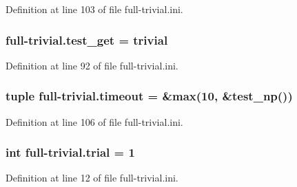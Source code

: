 Definition at line 103 of file full-\/trivial.\-ini.

\hypertarget{namespacefull-trivial_a3973918af8b0679a239a862cdc097804}{
\subsubsection[{test\-\_\-get}]{\setlength{\rightskip}{0pt plus 5cm}full-\/trivial.\-test\-\_\-get = trivial}}\label{namespacefull-trivial_a3973918af8b0679a239a862cdc097804}


Definition at line 92 of file full-\/trivial.\-ini.

\hypertarget{namespacefull-trivial_a87b2271fca0c5c5553c1a20d8ee1c11d}{
\subsubsection[{timeout}]{\setlength{\rightskip}{0pt plus 5cm}tuple full-\/trivial.\-timeout = \&max(10, \&test\-\_\-np())}}\label{namespacefull-trivial_a87b2271fca0c5c5553c1a20d8ee1c11d}


Definition at line 106 of file full-\/trivial.\-ini.

\hypertarget{namespacefull-trivial_a431381ca4d3ce0533b84fdf824145c45}{
\subsubsection[{trial}]{\setlength{\rightskip}{0pt plus 5cm}int full-\/trivial.\-trial = 1}}\label{namespacefull-trivial_a431381ca4d3ce0533b84fdf824145c45}


Definition at line 12 of file full-\/trivial.\-ini.

